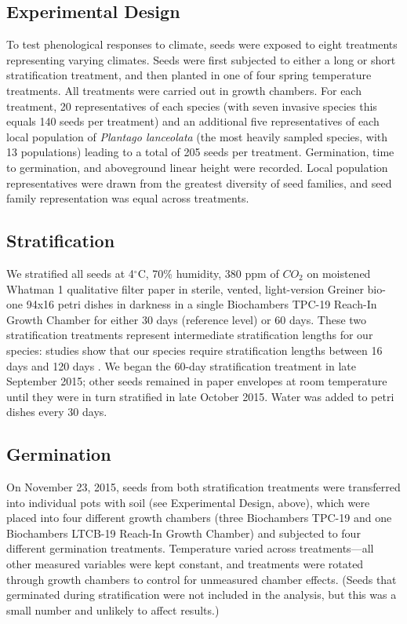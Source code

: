 \documentclass[12pt]{article}\usepackage[]{graphicx}\usepackage[]{color}
\begin{document}
	\subsection{Experimental Design} 
	To test phenological responses to climate, seeds were exposed to eight treatments representing varying climates. Seeds were first subjected to either a long or short stratification treatment, and then planted in one of four spring temperature treatments. All treatments were carried out in growth chambers. For each treatment, 20 representatives of each species (with seven invasive species this equals 140 seeds per treatment) and an additional five representatives of each local population of \textit{Plantago lanceolata} (the most heavily sampled species, with 13 populations) leading to a total of 205 seeds per treatment. Germination, time to germination, and aboveground linear height were recorded. Local population representatives were drawn from the greatest diversity of seed families, and seed family representation was equal across treatments. 
	
	\subsection{Stratification} 
	We stratified all seeds at 4$^\circ$C, 70\% humidity, 380 ppm of $CO_2$ \parencite[e.g.,][]{Meekins1999,Popay1970} on moistened Whatman 1 qualitative filter paper in sterile, vented, light-version Greiner bio-one 94x16 petri dishes in darkness \parencite{Baskin1998,Popay1970} in a single Biochambers TPC-19 Reach-In Growth Chamber for either 30 days (reference level) or 60 days. These two stratification treatments represent intermediate stratification lengths for our species: studies show that our species require stratification lengths between 16 days \parencite{Popay1970} and 120 days \parencite{Meekins1999}. We began the 60-day stratification treatment in late September 2015; other seeds remained in paper envelopes at room temperature until they were in turn stratified in late October 2015.  Water was added to petri dishes every 30 days.
	
	\subsection{Germination}
	On November 23, 2015, seeds from both stratification treatments were transferred into individual pots with soil (see Experimental Design, above), which were placed into four different growth chambers (three Biochambers TPC-19 and one Biochambers LTCB-19 Reach-In Growth Chamber) and subjected to four different germination treatments. Temperature varied across treatments---all other measured variables were kept constant, and treatments were rotated through growth chambers to control for unmeasured chamber effects. (Seeds that germinated during stratification were not included in the analysis, but this was a small number and unlikely to affect results.)
	
\end{document}
